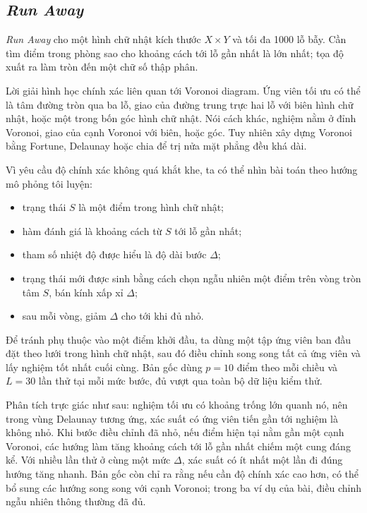 \documentclass[11pt]{article}
\begin{document}
\subsection{\textit{Run Away}}

\textit{Run Away} cho một hình chữ nhật kích thước \(X\times Y\) và tối đa
1000 lỗ bẫy. Cần tìm điểm trong phòng sao cho khoảng cách tới lỗ gần nhất là
lớn nhất; tọa độ xuất ra làm tròn đến một chữ số thập phân.

Lời giải hình học chính xác liên quan tới Voronoi diagram. Ứng viên tối ưu
có thể là tâm đường tròn qua ba lỗ, giao của đường trung trực hai lỗ với biên
hình chữ nhật, hoặc một trong bốn góc hình chữ nhật. Nói cách khác, nghiệm nằm
ở đỉnh Voronoi, giao của cạnh Voronoi với biên, hoặc góc. Tuy nhiên xây dựng
Voronoi bằng Fortune, Delaunay hoặc chia để trị nửa mặt phẳng đều khá dài.

Vì yêu cầu độ chính xác không quá khắt khe, ta có thể nhìn bài toán theo hướng
mô phỏng tôi luyện:
\begin{itemize}
  \item trạng thái \(S\) là một điểm trong hình chữ nhật;
  \item hàm đánh giá là khoảng cách từ \(S\) tới lỗ gần nhất;
  \item tham số nhiệt độ được hiểu là độ dài bước \(\Delta\);
  \item trạng thái mới được sinh bằng cách chọn ngẫu nhiên một điểm trên vòng
  tròn tâm \(S\), bán kính xấp xỉ \(\Delta\);
  \item sau mỗi vòng, giảm \(\Delta\) cho tới khi đủ nhỏ.
\end{itemize}

Để tránh phụ thuộc vào một điểm khởi đầu, ta dùng một tập ứng viên ban đầu đặt
theo lưới trong hình chữ nhật, sau đó điều chỉnh song song tất cả ứng viên và
lấy nghiệm tốt nhất cuối cùng. Bản gốc dùng \(p=10\) điểm theo mỗi chiều và
\(L=30\) lần thử tại mỗi mức bước, đủ vượt qua toàn bộ dữ liệu kiểm thử.

Phân tích trực giác như sau: nghiệm tối ưu có khoảng trống lớn quanh nó, nên
trong vùng Delaunay tương ứng, xác suất có ứng viên tiến gần tới nghiệm là
không nhỏ. Khi bước điều chỉnh đã nhỏ, nếu điểm hiện tại nằm gần một cạnh
Voronoi, các hướng làm tăng khoảng cách tới lỗ gần nhất chiếm một cung đáng
kể. Với nhiều lần thử ở cùng một mức \(\Delta\), xác suất có ít nhất một lần
đi đúng hướng tăng nhanh. Bản gốc còn chỉ ra rằng nếu cần độ chính xác cao
hơn, có thể bổ sung các hướng song song với cạnh Voronoi; trong ba ví dụ của
bài, điều chỉnh ngẫu nhiên thông thường đã đủ.
\end{document}
